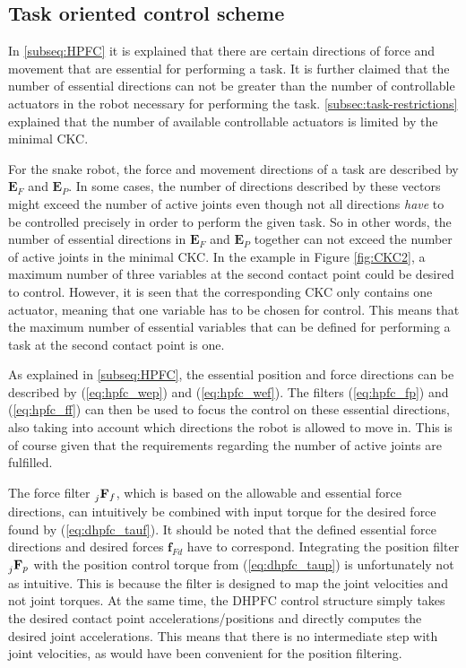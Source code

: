 \subsection{Task oriented control scheme}


In \ref{subseq:HPFC} it is explained that there are certain directions of force and movement that are essential for performing a task. It is further claimed that the number of essential directions can not be greater than the number of controllable actuators in the robot necessary for performing the task. \ref{subsec:task-restrictions} explained that the number of available controllable actuators is limited by the minimal CKC.

For the snake robot, the force and movement directions of a task are described by $\mathbf{E}_F$ and $\mathbf{E}_P$. In some cases, the number of directions described by these vectors might exceed the number of active joints even though not all directions \textit{have} to be controlled precisely in order to perform the given task. So in other words, the number of essential directions in $\mathbf{E}_F$ and $\mathbf{E}_P$ together can not exceed the number of active joints in the minimal CKC. In the example in Figure \ref{fig:CKC2}, a maximum number of three variables at the second contact point could be desired to control. However, it is seen that the corresponding CKC only contains one actuator, meaning that one variable has to be chosen for control. This means that the maximum number of essential variables that can be defined for performing a task at the second contact point is one.

As explained in \ref{subseq:HPFC}, the essential position and force directions can be described by (\ref{eq:hpfc_wep}) and (\ref{eq:hpfc_wef}). The filters (\ref{eq:hpfc_fp}) and (\ref{eq:hpfc_ff}) can then be used to focus the control on these essential directions, also taking into account which directions the robot is allowed to move in. This is of course given that the requirements regarding the number of active joints are fulfilled.

The force filter $\prescript{}{j}{\mathbf{F}}_{f}$, which is based on the allowable and essential force directions, can intuitively be combined with input torque for the desired force found by (\ref{eq:dhpfc_tauf}). It should be noted that the defined essential force directions and desired forces $\mathbf{f}_{Fd}$ have to correspond. Integrating the position filter $\prescript{}{j}{\mathbf{F}}_{p}$ with the position control torque from (\ref{eq:dhpfc_taup}) is unfortunately not as intuitive. This is because the filter is designed to map the joint velocities and not joint torques. At the same time, the DHPFC control structure simply takes the desired contact point accelerations/positions and directly computes the desired joint accelerations. This means that there is no intermediate step with joint velocities, as would have been convenient for the position filtering.

